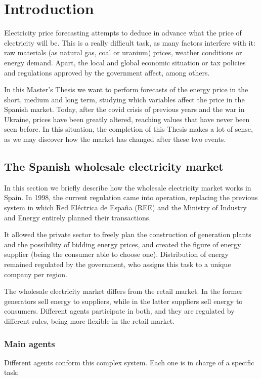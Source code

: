\chapter{Introduction}
Electricity price forecasting attempts to deduce in advance what the price of electricity will be.
This is a really difficult task, as many factors interfere with it: raw materials (as natural gas, coal or uranium) prices, weather conditions or energy demand.
Apart, the local and global economic situation or tax policies and regulations approved by the government affect, among others.

In this Master's Thesis we want to perform forecasts of the energy price in the short, medium and long term, studying which variables affect the price in the Spanish market.
Today, after the covid crisis of previous years and the war in Ukraine, prices have been greatly altered, reaching values that have never been seen before.
In this situation, the completion of this Thesis makes a lot of sense, as we may discover how the market has changed after these two events.


\section{The Spanish wholesale electricity market}
In this section we briefly describe how the wholesale electricity market works in Spain.
In 1998, the current regulation came into operation, replacing the previous system in which Red Eléctrica de España (REE) and the Ministry of Industry and Energy entirely planned their transactions.

It allowed the private sector to freely plan the construction of generation plants and the possibility of bidding energy prices, and created the figure of energy supplier (being the consumer able to choose one).
Distribution of energy remained regulated by the government, who assigns this task to a unique company per region. \cite{mercado-electrico-mincotur}

The wholesale electricity market differs from the retail market. In the former generators sell energy to suppliers, while in the latter suppliers sell energy to consumers. Different agents participate in both, and they are regulated by different rules, being more flexible in the retail market.

\subsection{Main agents}
Different agents conform this complex system. Each one is in charge of a specific task:\cite{mercado-electrico-endesa, organismos-reguladores-holaluz}

